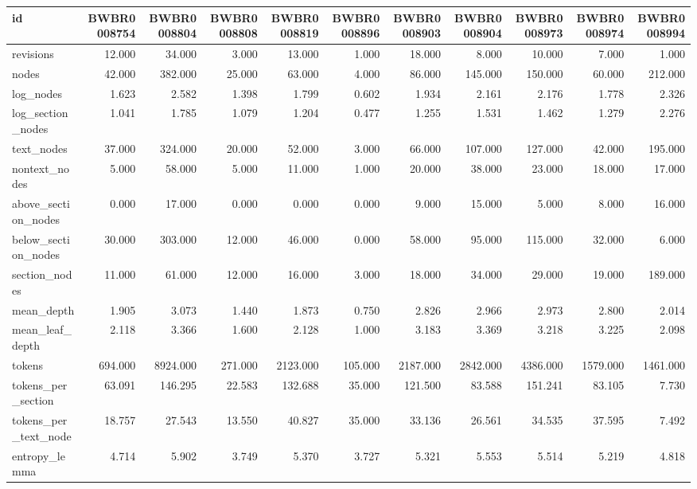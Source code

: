 \begin{tabular}{lrrrrrrrrrr}
\toprule
id & BWBR0008754 & BWBR0008804 & BWBR0008808 & BWBR0008819 & BWBR0008896 & BWBR0008903 & BWBR0008904 & BWBR0008973 & BWBR0008974 & BWBR0008994 \\
\midrule
revisions & 12.000 & 34.000 & 3.000 & 13.000 & 1.000 & 18.000 & 8.000 & 10.000 & 7.000 & 1.000 \\
\cline{1-11}
nodes & 42.000 & 382.000 & 25.000 & 63.000 & 4.000 & 86.000 & 145.000 & 150.000 & 60.000 & 212.000 \\
\cline{1-11}
log\_nodes & 1.623 & 2.582 & 1.398 & 1.799 & 0.602 & 1.934 & 2.161 & 2.176 & 1.778 & 2.326 \\
\cline{1-11}
log\_section\_nodes & 1.041 & 1.785 & 1.079 & 1.204 & 0.477 & 1.255 & 1.531 & 1.462 & 1.279 & 2.276 \\
\cline{1-11}
text\_nodes & 37.000 & 324.000 & 20.000 & 52.000 & 3.000 & 66.000 & 107.000 & 127.000 & 42.000 & 195.000 \\
\cline{1-11}
nontext\_nodes & 5.000 & 58.000 & 5.000 & 11.000 & 1.000 & 20.000 & 38.000 & 23.000 & 18.000 & 17.000 \\
\cline{1-11}
above\_section\_nodes & 0.000 & 17.000 & 0.000 & 0.000 & 0.000 & 9.000 & 15.000 & 5.000 & 8.000 & 16.000 \\
\cline{1-11}
below\_section\_nodes & 30.000 & 303.000 & 12.000 & 46.000 & 0.000 & 58.000 & 95.000 & 115.000 & 32.000 & 6.000 \\
\cline{1-11}
section\_nodes & 11.000 & 61.000 & 12.000 & 16.000 & 3.000 & 18.000 & 34.000 & 29.000 & 19.000 & 189.000 \\
\cline{1-11}
mean\_depth & 1.905 & 3.073 & 1.440 & 1.873 & 0.750 & 2.826 & 2.966 & 2.973 & 2.800 & 2.014 \\
\cline{1-11}
mean\_leaf\_depth & 2.118 & 3.366 & 1.600 & 2.128 & 1.000 & 3.183 & 3.369 & 3.218 & 3.225 & 2.098 \\
\cline{1-11}
tokens & 694.000 & 8924.000 & 271.000 & 2123.000 & 105.000 & 2187.000 & 2842.000 & 4386.000 & 1579.000 & 1461.000 \\
\cline{1-11}
tokens\_per\_section & 63.091 & 146.295 & 22.583 & 132.688 & 35.000 & 121.500 & 83.588 & 151.241 & 83.105 & 7.730 \\
\cline{1-11}
tokens\_per\_text\_node & 18.757 & 27.543 & 13.550 & 40.827 & 35.000 & 33.136 & 26.561 & 34.535 & 37.595 & 7.492 \\
\cline{1-11}
entropy\_lemma & 4.714 & 5.902 & 3.749 & 5.370 & 3.727 & 5.321 & 5.553 & 5.514 & 5.219 & 4.818 \\

\end{tabular}

